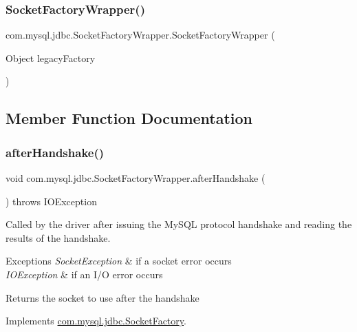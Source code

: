 \subsubsection{\texorpdfstring{Socket\+Factory\+Wrapper()}{SocketFactoryWrapper()}}
{\footnotesize\ttfamily com.\+mysql.\+jdbc.\+Socket\+Factory\+Wrapper.\+Socket\+Factory\+Wrapper (\begin{DoxyParamCaption}\item[{Object}]{legacy\+Factory }\end{DoxyParamCaption})}



\subsection{Member Function Documentation}
\mbox{\label{classcom_1_1mysql_1_1jdbc_1_1_socket_factory_wrapper_ab7dde0fd740255950d83759b418fd2ff}} 
\subsubsection{\texorpdfstring{after\+Handshake()}{afterHandshake()}}
{\footnotesize\ttfamily void com.\+mysql.\+jdbc.\+Socket\+Factory\+Wrapper.\+after\+Handshake (\begin{DoxyParamCaption}{ }\end{DoxyParamCaption}) throws I\+O\+Exception}

Called by the driver after issuing the My\+S\+QL protocol handshake and reading the results of the handshake.


\begin{DoxyExceptions}{Exceptions}
{\em Socket\+Exception} & if a socket error occurs \\
\hline
{\em I\+O\+Exception} & if an I/O error occurs\\
\hline
\end{DoxyExceptions}
\begin{DoxyReturn}{Returns}
the socket to use after the handshake 
\end{DoxyReturn}


Implements \mbox{\hyperlink{interfacecom_1_1mysql_1_1jdbc_1_1_socket_factory_adc5277dd008da61b24261a983202f5bf}{com.\+mysql.\+jdbc.\+Socket\+Factory}}.


